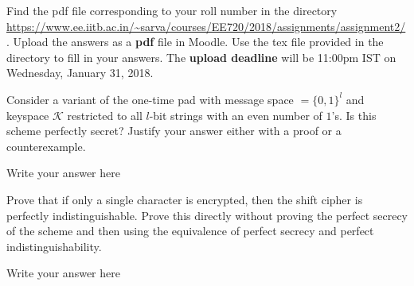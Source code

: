 \documentclass[12pt,a4paper,answers]{exam}
\begin{document}
\pagestyle{head}
\headrule
{}
%

\extraheadheight{.4in}%
\extrafootheight{-0.5in}%
\extrawidth{0.5in}%

Find the pdf file corresponding to your roll number in the directory \url{https://www.ee.iitb.ac.in/~sarva/courses/EE720/2018/assignments/assignment2/}. Upload the answers as a \textbf{pdf} file in Moodle. Use the tex file provided in the directory to fill in your answers. The \textbf{upload deadline} will be 11:00pm IST on Wednesday, January 31, 2018.
\begin{questions}
\question[5] Consider a variant of the one-time pad with message space $\mathcal = \{0,1\}^l$ and keyspace $\mathcal{K}$ restricted to all $l$-bit strings with an even number of $1$'s. Is this scheme perfectly secret? Justify your answer either with a proof or a counterexample.
  \begin{solution}
    Write your answer here
  \end{solution}

  \question[5] Prove that if only a single character is encrypted, then the shift cipher is perfectly indistinguishable. Prove this directly without proving the perfect secrecy of the scheme and then using the equivalence of perfect secrecy and perfect indistinguishability.
  \begin{solution}
    Write your answer here
  \end{solution}

  
\end{questions}
\end{document}
